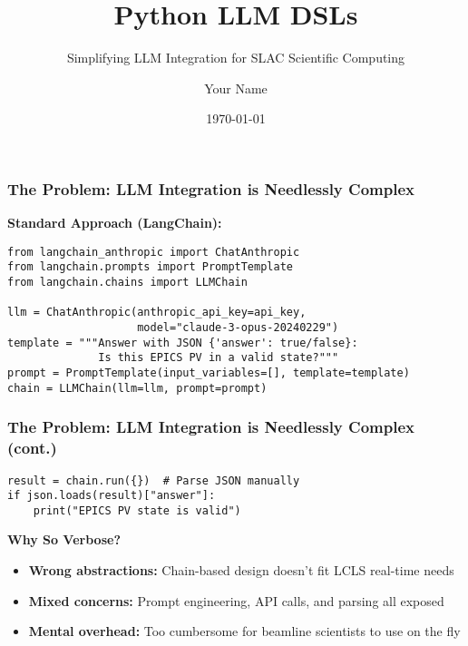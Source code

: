 \documentclass{beamer}
\title{Python LLM DSLs}
\subtitle{Simplifying LLM Integration for SLAC Scientific Computing}
\author{Your Name}
\date{\today}
\begin{document}
\begin{frame}
\titlepage
\end{frame}

\begin{frame}[fragile]
\frametitle{The Problem: LLM Integration is Needlessly Complex}

\textbf{Standard Approach (LangChain):}
\begin{lstlisting}
from langchain_anthropic import ChatAnthropic
from langchain.prompts import PromptTemplate
from langchain.chains import LLMChain

llm = ChatAnthropic(anthropic_api_key=api_key, 
                    model="claude-3-opus-20240229")
template = """Answer with JSON {'answer': true/false}: 
              Is this EPICS PV in a valid state?"""
prompt = PromptTemplate(input_variables=[], template=template)
chain = LLMChain(llm=llm, prompt=prompt)
\end{lstlisting}
\end{frame}

\begin{frame}[fragile]
\frametitle{The Problem: LLM Integration is Needlessly Complex (cont.)}

\begin{lstlisting}
result = chain.run({})  # Parse JSON manually
if json.loads(result)["answer"]:
    print("EPICS PV state is valid")
\end{lstlisting}

\vspace{0.3cm}
\textbf{Why So Verbose?}
\begin{itemize}
\item \textbf{Wrong abstractions:} Chain-based design doesn't fit LCLS real-time needs
\item \textbf{Mixed concerns:} Prompt engineering, API calls, and parsing all exposed
\item \textbf{Mental overhead:} Too cumbersome for beamline scientists to use on the fly
\end{itemize}
\end{frame}
\end{document}
